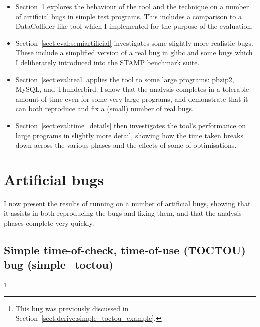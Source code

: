 \begin{itemize}
\item Section~\ref{sect:eval:artificial} explores the behaviour of the
  tool and the technique on a number of artificial bugs in simple test
  programs.  This includes a comparison to a
  DataCollider\needCite{}-like tool which I implemented for the
  purpose of the evaluation.
\item Section~\ref{sect:eval:semiartificial} investigates some
  slightly more realistic bugs.  These include a simplified version of
  a real bug in glibc\needCite{} and some bugs which I deliberately
  introduced into the STAMP benchmark suite\needCite{}.
\item Section~\ref{sect:eval:real} applies the tool to some large
  programs: pbzip2\needCite{}, MySQL\needCite{}, and
  Thunderbird\needCite{}.  I show that the analysis completes in a
  tolerable amount of time even for some very large programs,
  and demonstrate that it can both reproduce and fix a (small)
  number of real bugs.
\item Section~\ref{sect:eval:time_details} then investigates the
  tool's performance on large programs in slightly more detail,
  showing how the time taken breaks down across the various phases
  and the effects of some of {\implementation} optimisations.
\end{itemize}

\section{Artificial bugs}
\label{sect:eval:artificial}

I now present the results of running {\implementation} on a number of
artificial bugs, showing that it assists in both reproducing the bugs
and fixing them, and that the analysis phases complete very quickly.

\subsection{Simple time-of-check, time-of-use (TOCTOU) bug (simple\_toctou)}\footnote{This bug was previously discussed in
  Section~\ref{sect:derive:simple_toctou_example}.}
\label{sect:eval:simple_toctou}


